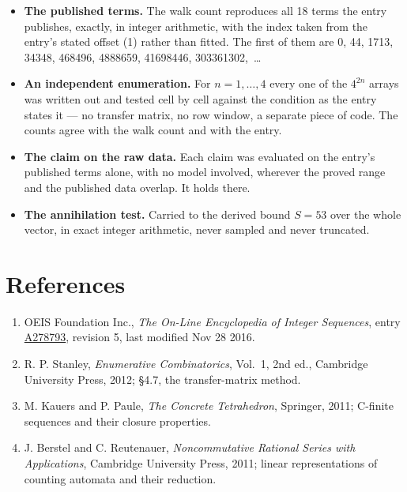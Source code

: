 \documentclass[11pt]{article}
\theoremstyle{definition}
\begin{document}
\begin{itemize}

\item {\bfseries The published terms.} The walk count reproduces all 18 terms the entry publishes, exactly, in integer arithmetic, with the index taken from the entry's stated offset (1) rather than fitted. The first of them are 0, 44, 1713, 34348, 468496, 4888659, 41698446, 303361302,~\dots

\item {\bfseries An independent enumeration.} For $n = 1,\dots,4$ every one of the $4^{2n}$ arrays was written out and tested cell by cell against the condition as the entry states it --- no transfer matrix, no row window, a separate piece of code. The counts agree with the walk count and with the entry.

\item {\bfseries The claim on the raw data.} Each claim was evaluated on the entry's published terms alone, with no model involved, wherever the proved range and the published data overlap. It holds there.

\item {\bfseries The annihilation test.} Carried to the derived bound $S = 53$ over the whole vector, in exact integer arithmetic, never sampled and never truncated.

\end{itemize}

\section{References}

\begin{enumerate}

\item OEIS Foundation Inc., \emph{The On-Line Encyclopedia of Integer Sequences}, entry \href{https://oeis.org/A278793}{A278793}, revision 5, last modified Nov 28 2016.

\item R. P. Stanley, \emph{Enumerative Combinatorics}, Vol.~1, 2nd ed., Cambridge University Press, 2012; \S4.7, the transfer-matrix method.

\item M. Kauers and P. Paule, \emph{The Concrete Tetrahedron}, Springer, 2011; C-finite sequences and their closure properties.

\item J. Berstel and C. Reutenauer, \emph{Noncommutative Rational Series with Applications}, Cambridge University Press, 2011; linear representations of counting automata and their reduction.

\end{enumerate}
\end{document}
